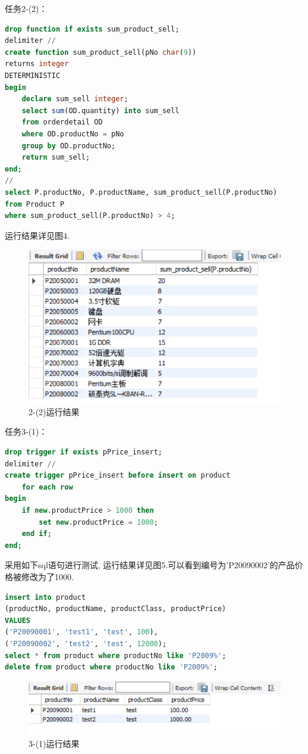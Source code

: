 \documentclass[a4paper,UTF8]{article}
\theoremstyle{definition}
\begin{document}
\begin{CJK}{UTF8}{gkai}
{\heiti \large 任务2-(2)：}
\begin{lstlisting}[language=SQL]
drop function if exists sum_product_sell;
delimiter //
create function sum_product_sell(pNo char(9))
returns integer
DETERMINISTIC
begin
	declare sum_sell integer;
	select sum(OD.quantity) into sum_sell
    from orderdetail OD
    where OD.productNo = pNo
    group by OD.productNo;
    return sum_sell;
end;
//
select P.productNo, P.productName, sum_product_sell(P.productNo)
from Product P
where sum_product_sell(P.productNo) > 4;
\end{lstlisting}
\par 运行结果详见图4.
\begin{figure}[h]
\centering
\includegraphics[scale=0.6]{./img/2-2.png}
\caption{2-(2)运行结果}
\label{fig:label}
\end{figure}

{\heiti \large 任务3-(1)：}
\begin{lstlisting}[language=SQL]
drop trigger if exists pPrice_insert;
delimiter //
create trigger pPrice_insert before insert on product
	for each row
begin
	if new.productPrice > 1000 then
		set new.productPrice = 1000;
	end if;
end;
\end{lstlisting}
\par 采用如下sql语句进行测试, 运行结果详见图5.可以看到编号为'P20090002'的产品价格被修改为了1000.
\begin{lstlisting}[language=SQL]
insert into product
(productNo, productName, productClass, productPrice)
VALUES
('P20090001', 'test1', 'test', 100),
('P20090002', 'test2', 'test', 12000);
select * from product where productNo like 'P2009%';
delete from product where productNo like 'P2009%';
\end{lstlisting}
\begin{figure}[h]
\centering
\includegraphics[scale=1]{./img/3-1.png}
\caption{3-(1)运行结果}
\label{fig:label}
\end{figure}


\end{CJK}
\end{document}
